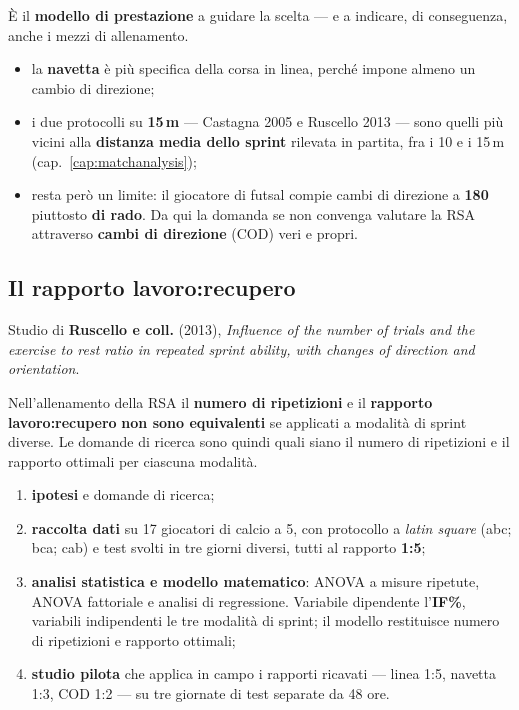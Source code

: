 È il \textbf{modello di prestazione} a guidare la scelta --- e a indicare, di conseguenza, anche i
mezzi di allenamento.
\begin{itemize}
  \item la \textbf{navetta} è più specifica della corsa in linea, perché impone almeno un cambio
    di direzione;
  \item i due protocolli su \textbf{15\,m} --- Castagna 2005 e Ruscello 2013 --- sono quelli più
    vicini alla \textbf{distanza media dello sprint} rilevata in partita, fra i 10 e i 15\,m
    (cap.~\ref{cap:matchanalysis});
  \item resta però un limite: il giocatore di futsal compie cambi di direzione a
    \textbf{180\textdegree} piuttosto \textbf{di rado}. Da qui la domanda se non convenga valutare
    la RSA attraverso \textbf{cambi di direzione} (COD) veri e propri.
\end{itemize}

\subsection{Il rapporto lavoro:recupero}

Studio di \textbf{Ruscello e coll.} (2013), \textit{Influence of the number of trials and the
exercise to rest ratio in repeated sprint ability, with changes of direction and orientation}.

Nell'allenamento della RSA il \textbf{numero di ripetizioni} e il \textbf{rapporto
lavoro:recupero} \textbf{non sono equivalenti} se applicati a modalità di sprint diverse. Le
domande di ricerca sono quindi quali siano il numero di ripetizioni e il rapporto ottimali per
ciascuna modalità.

\begin{enumerate}
  \item \textbf{ipotesi} e domande di ricerca;
  \item \textbf{raccolta dati} su 17 giocatori di calcio a 5, con protocollo a
    \textit{latin square} (abc; bca; cab) e test svolti in tre giorni diversi, tutti al rapporto
    \textbf{1:5};
  \item \textbf{analisi statistica e modello matematico}: ANOVA a misure ripetute, ANOVA
    fattoriale e analisi di regressione. Variabile dipendente l'\textbf{IF\%}, variabili
    indipendenti le tre modalità di sprint; il modello restituisce numero di ripetizioni e
    rapporto ottimali;
  \item \textbf{studio pilota} che applica in campo i rapporti ricavati --- linea 1:5, navetta
    1:3, COD 1:2 --- su tre giornate di test separate da 48 ore.
\end{enumerate}

